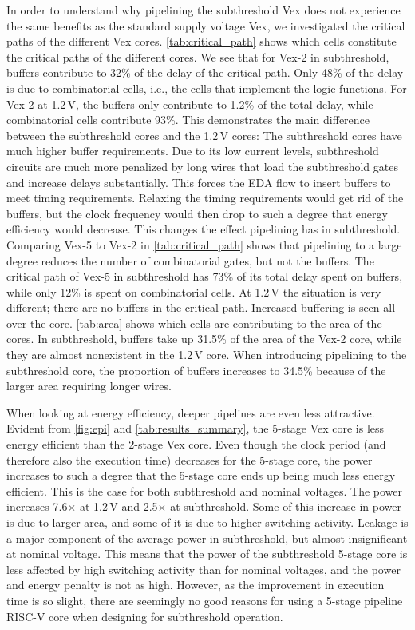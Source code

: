In order to understand why pipelining the subthreshold Vex does not experience the same benefits as the standard supply voltage Vex, we investigated the critical paths of the different Vex cores.  \autoref{tab:critical_path} shows which cells constitute the critical paths of the different cores. 
We see that for Vex-2 in subthreshold, buffers contribute to 32\% of the delay of the critical path.
Only 48\% of the delay is due to combinatorial cells, i.e., the cells that implement the logic functions.
For Vex-2 at 1.2\,V, the buffers only contribute to 1.2\% of the total delay, while combinatorial cells contribute 93\%.
This demonstrates the main difference between the subthreshold cores and the 1.2\,V cores: The subthreshold cores have much higher buffer requirements.  Due to its low current levels, subthreshold circuits are much more penalized by long wires that load the subthreshold gates and increase delays substantially.  This forces the EDA flow to insert buffers to meet timing requirements.  Relaxing the timing requirements would get rid of the buffers, but the clock frequency would then drop to such a degree that energy efficiency would decrease.  This changes the effect pipelining has in subthreshold. 
Comparing Vex-5 to Vex-2 in \autoref{tab:critical_path} shows that pipelining to a large degree reduces the number of combinatorial gates, but not the buffers.  The critical path of Vex-5 in subthreshold has 73\% of its total delay spent on buffers, while only 12\% is spent on combinatorial cells.  At 1.2\,V the situation is very different; there are no buffers in the critical path. 
Increased buffering is seen all over the core.  \autoref{tab:area} shows which cells are contributing to the area of the cores.  In subthreshold, buffers take up 31.5\% of the area of the Vex-2 core, while they are almost nonexistent in the 1.2\,V core.  When introducing pipelining to the subthreshold core, the proportion of buffers increases to 34.5\% because of the larger area requiring longer wires. 

When looking at energy efficiency, deeper pipelines are even less attractive.
Evident from \autoref{fig:epi} and \autoref{tab:results_summary}, the 5-stage Vex core is less energy efficient than the 2-stage Vex core.
Even though the clock period (and therefore also the execution time) decreases for the 5-stage core, the power increases to such a degree that the 5-stage core ends up being much less energy efficient.
This is the case for both subthreshold and nominal voltages.
The power increases 7.6$\times$ at 1.2\,V and 2.5$\times$ at subthreshold.
Some of this increase in power is due to larger area, and some of it is due to higher switching activity.
Leakage is a major component of the average power in subthreshold, but almost insignificant at nominal voltage.
This means that the power of the subthreshold 5-stage core is less affected by high switching activity than for nominal voltages, and the power and energy penalty is not as high.
However, as the improvement in execution time is so slight, there are seemingly no good reasons for using a 5-stage pipeline RISC-V core when designing for subthreshold operation.  
